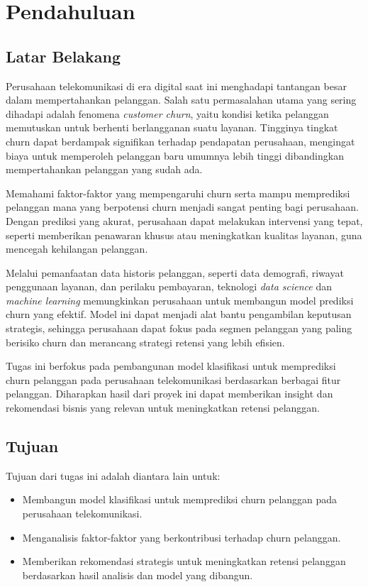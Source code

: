 \section{Pendahuluan}
\subsection{Latar Belakang}

Perusahaan telekomunikasi di era digital saat ini menghadapi tantangan besar dalam mempertahankan pelanggan. Salah satu permasalahan utama yang sering dihadapi adalah fenomena \textit{customer churn}, yaitu kondisi ketika pelanggan memutuskan untuk berhenti berlangganan suatu layanan. Tingginya tingkat churn dapat berdampak signifikan terhadap pendapatan perusahaan, mengingat biaya untuk memperoleh pelanggan baru umumnya lebih tinggi dibandingkan mempertahankan pelanggan yang sudah ada.

Memahami faktor-faktor yang mempengaruhi churn serta mampu memprediksi pelanggan mana yang berpotensi churn menjadi sangat penting bagi perusahaan. Dengan prediksi yang akurat, perusahaan dapat melakukan intervensi yang tepat, seperti memberikan penawaran khusus atau meningkatkan kualitas layanan, guna mencegah kehilangan pelanggan.

Melalui pemanfaatan data historis pelanggan, seperti data demografi, riwayat penggunaan layanan, dan perilaku pembayaran, teknologi \textit{data science} dan \textit{machine learning} memungkinkan perusahaan untuk membangun model prediksi churn yang efektif. Model ini dapat menjadi alat bantu pengambilan keputusan strategis, sehingga perusahaan dapat fokus pada segmen pelanggan yang paling berisiko churn dan merancang strategi retensi yang lebih efisien.

Tugas ini berfokus pada pembangunan model klasifikasi untuk memprediksi churn pelanggan pada perusahaan telekomunikasi berdasarkan berbagai fitur pelanggan. Diharapkan hasil dari proyek ini dapat memberikan insight dan rekomendasi bisnis yang relevan untuk meningkatkan retensi pelanggan.

\subsection{Tujuan}
Tujuan dari tugas ini adalah diantara lain untuk:

\begin{itemize}
    \item Membangun model klasifikasi untuk memprediksi churn pelanggan pada perusahaan telekomunikasi.
    \item Menganalisis faktor-faktor yang berkontribusi terhadap churn pelanggan.
    \item Memberikan rekomendasi strategis untuk meningkatkan retensi pelanggan berdasarkan hasil analisis dan model yang dibangun.
\end{itemize}

